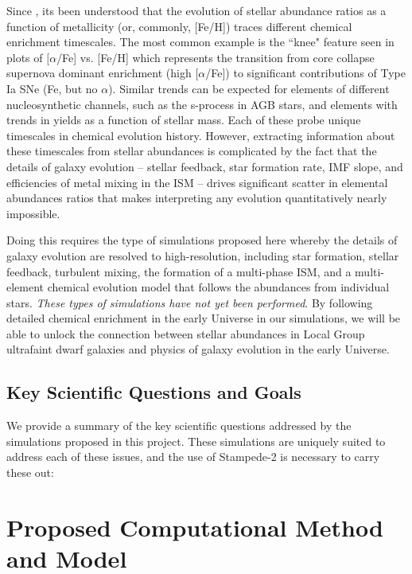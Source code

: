 \documentclass[12pt]{article} %
\begin{document}
Since \cite{Tinsley1980}, its been understood that the evolution of stellar abundance ratios as a function of metallicity (or, commonly, [Fe/H]) traces different chemical enrichment timescales. The most common example is the ``knee" feature seen in plots of $[\alpha$/Fe] vs. [Fe/H] which represents the transition from core collapse supernova dominant enrichment (high $[\alpha$/Fe]) to significant contributions of Type Ia SNe (Fe, but no $\alpha$). Similar trends can be expected for elements of different nucleosynthetic channels, such as the s-process in AGB stars, and elements with trends in yields as a function of stellar mass. Each of these probe unique timescales in chemical evolution history. However, extracting information about these timescales from stellar abundances is complicated by the fact that the details of galaxy evolution -- stellar feedback, star formation rate, IMF slope, and efficiencies of metal mixing in the ISM -- drives significant scatter in elemental abundances ratios that makes interpreting any evolution quantitatively nearly impossible.

Doing this requires the type of simulations proposed here whereby the details of galaxy evolution are resolved to high-resolution, including star formation, stellar feedback, turbulent mixing, the formation of a multi-phase ISM, and a multi-element chemical evolution model that follows the abundances from individual stars. \textit{These types of simulations have not yet been performed}. By following detailed chemical enrichment in the early Universe in our simulations, we will be able to unlock the connection between stellar abundances in Local Group ultrafaint dwarf galaxies and physics of galaxy evolution in the early Universe.


\subsection{Key Scientific Questions and Goals}

We provide a summary of the key scientific questions addressed by the simulations proposed in this project. These simulations are uniquely suited to address each of these issues, and the use of Stampede-2 is necessary to carry these out:


\section{Proposed Computational Method and Model}
\end{document}
